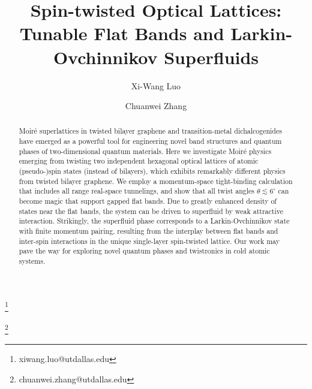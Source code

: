 \documentclass[twocolumn,english,prl,floatfix,citeautoscript,nofootinbib]{revtex4}
\begin{document}
\title{Spin-twisted Optical Lattices: Tunable Flat Bands and
Larkin-Ovchinnikov Superfluids}
\author{Xi-Wang Luo}
\thanks{xiwang.luo@utdallas.edu}
\author{Chuanwei Zhang}
\thanks{chuanwei.zhang@utdallas.edu}

\begin{abstract}
Moir\'{e} superlattices in twisted bilayer graphene and transition-metal
dichalcogenides have emerged as a powerful tool for engineering novel band
structures and quantum phases of two-dimensional quantum materials. Here we
investigate Moir\'{e} physics emerging from twisting two independent
hexagonal optical lattices of atomic (pseudo-)spin states (instead of
bilayers), which exhibits remarkably different physics from twisted bilayer
graphene. We employ a momentum-space tight-binding calculation that includes
all range real-space tunnelings, and show that all twist angles $\theta
\lesssim 6^{\circ }$ can become magic that support gapped flat bands. Due to
greatly enhanced density of states near the flat bands, the system can be
driven to superfluid by weak attractive interaction. Strikingly, the
superfluid phase corresponds to a Larkin-Ovchinnikov state with finite
momentum pairing, resulting from the interplay between flat bands and
inter-spin interactions in the unique single-layer spin-twisted lattice. Our
work may pave the way for exploring novel quantum phases and twistronics in
cold atomic systems.
\end{abstract}

\maketitle
\end{document}

